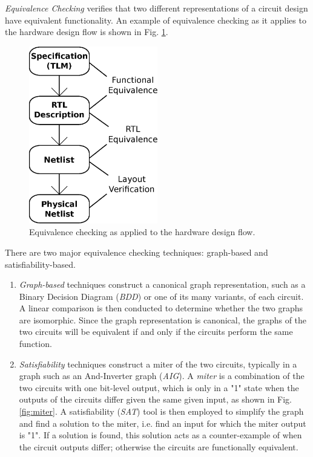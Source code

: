 {\it Equivalence Checking} verifies that two different representations of
a circuit design have equivalent functionality. An example of equivalence
checking as it applies to the hardware design flow is shown in
Fig. \ref{fig:equivflow}.

{
\begin{figure}[h]
\centerline{
\includegraphics[width=0.5\textwidth]{./figures/designVerification}
}
\caption{Equivalence checking as applied to the hardware design flow.}
\label{fig:equivflow}
\end{figure}
}

There are two major
equivalence checking techniques: graph-based
and satisfiability-based.
\begin{enumerate}
\item \emph{Graph-based} techniques construct a canonical graph 
representation, such as a Binary Decision Diagram (\emph{BDD}) or one of
its many variants, of each circuit. A linear comparison is then conducted to 
determine whether the two graphs are isomorphic. Since the graph 
representation is canonical, the graphs of the two circuits will be 
equivalent if and only if the circuits perform the same function.
\item \emph{Satisfiability} techniques construct a miter of the two circuits,
typically in a graph such as an And-Inverter graph (\emph{AIG}). A
\emph{miter} is a combination of the two circuits with one bit-level output, which 
is only in a "1" state when the outputs of the circuits differ given 
the same given 
input, as shown in Fig. \ref{fig:miter}. 
A satisfiability (\emph{SAT}) tool \cite{csat} 
is then employed to simplify the graph and find a solution to the miter, 
i.e. find an input for which the 
miter output is "1". If a solution is found, this solution acts as a 
counter-example of when the circuit outputs differ; otherwise the circuits
are functionally equivalent.
\end{enumerate}


